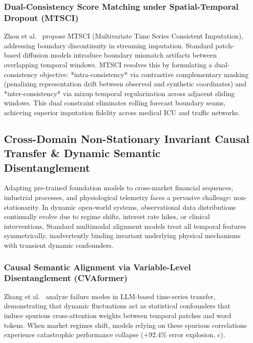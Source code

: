 \subsubsection{Dual-Consistency Score Matching under Spatial-Temporal Dropout (MTSCI)}
Zhou et al.~\cite{Zhou2024MTSCI} propose MTSCI (Multivariate Time Series Consistent Imputation), addressing boundary discontinuity in streaming imputation. Standard patch-based diffusion models introduce boundary mismatch artifacts between overlapping temporal windows. MTSCI resolves this by formulating a dual-consistency objective: *intra-consistency* via contrastive complementary masking (penalizing representation drift between observed and synthetic coordinates) and *inter-consistency* via mixup temporal regularization across adjacent sliding windows. This dual constraint eliminates rolling forecast boundary seams, achieving superior imputation fidelity across medical ICU and traffic networks.

\subsection{Cross-Domain Non-Stationary Invariant Causal Transfer \& Dynamic Semantic Disentanglement}
\label{sec:causal_invariant_transfer}
Adapting pre-trained foundation models to cross-market financial sequences, industrial processes, and physiological telemetry faces a pervasive challenge: non-stationarity. In dynamic open-world systems, observational data distributions continually evolve due to regime shifts, interest rate hikes, or clinical interventions. Standard multimodal alignment models treat all temporal features symmetrically, inadvertently binding invariant underlying physical mechanisms with transient dynamic confounders.

\subsubsection{Causal Semantic Alignment via Variable-Level Disentanglement (CVAformer)}
Zhang et al.~\cite{Zhang2026CVAformer} analyze failure modes in LLM-based time-series transfer, demonstrating that dynamic fluctuations act as statistical confounders that induce spurious cross-attention weights between temporal patches and word tokens. When market regimes shift, models relying on these spurious correlations experience catastrophic performance collapse ($+92.4\%$ error explosion, c).

